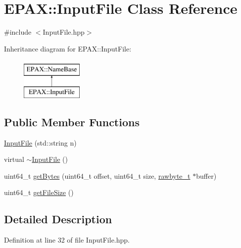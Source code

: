 \hypertarget{class_e_p_a_x_1_1_input_file}{\section{\-E\-P\-A\-X\-:\-:\-Input\-File \-Class \-Reference}
\label{class_e_p_a_x_1_1_input_file}
}


{\ttfamily \#include $<$\-Input\-File.\-hpp$>$}

\-Inheritance diagram for \-E\-P\-A\-X\-:\-:\-Input\-File\-:\begin{figure}[H]
\begin{center}
\leavevmode
\includegraphics[height=2.000000cm]{class_e_p_a_x_1_1_input_file}
\end{center}
\end{figure}
\subsection*{\-Public \-Member \-Functions}
\begin{DoxyCompactItemize}
\item 
\hyperlink{class_e_p_a_x_1_1_input_file_a78bd5d3b22843d59b7a596fd714928ce}{\-Input\-File} (std\-::string n)
\item 
virtual \hyperlink{class_e_p_a_x_1_1_input_file_a89d4cd0f11e75985ae1d7528e864016f}{$\sim$\-Input\-File} ()
\item 
uint64\-\_\-t \hyperlink{class_e_p_a_x_1_1_input_file_a4b7b6d515479e8d3006041a34f15b526}{get\-Bytes} (uint64\-\_\-t offset, uint64\-\_\-t size, \hyperlink{_e_p_a_x_common_internal_8hpp_a17755bdd71c02e656c667b16de61dd7b}{rawbyte\-\_\-t} $\ast$buffer)
\item 
uint64\-\_\-t \hyperlink{class_e_p_a_x_1_1_input_file_aad97988077800254811c944ad6858d1f}{get\-File\-Size} ()
\end{DoxyCompactItemize}


\subsection{\-Detailed \-Description}


\-Definition at line 32 of file \-Input\-File.\-hpp.



